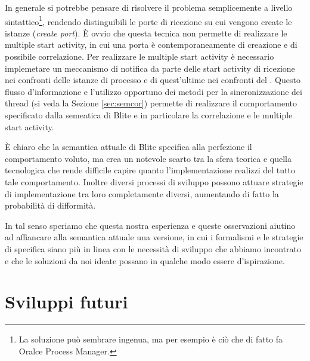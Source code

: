 In generale si potrebbe pensare di risolvere il problema semplicemente a livello
sintattico\footnote{La soluzione può sembrare ingenua, ma per esempio è ciò che
di fatto fa Oralce Process Manager.}, rendendo distinguibili le porte di
ricezione su cui vengono create le istanze (\emph{create port}). \`E ovvio che
questa tecnica non permette di realizzare le multiple start activity, in cui una
porta è contemporaneamente di creazione e di possibile correlazione. Per
realizzare le multiple start activity è necessario implemetare un meccanismo di
notifica da parte delle start activity di ricezione nei confronti delle istanze
di processo e di quest'ultime nei confronti del . Questo
flusso d'informazione e l'utilizzo opportuno dei metodi per la sincronizzazione
dei thread (si veda la Sezione \ref{sec:semcor}) permette di realizzare il comportamento
specificato dalla semeatica di Blite e in particolare la correlazione e le
multiple start activity.


\`E chiaro che la semantica attuale di Blite specifica alla perfezione il
comportamento voluto, ma crea un notevole scarto tra la sfera teorica e quella
tecnologica che rende difficile capire quanto l'implementazione realizzi del
tutto tale comportamento. Inoltre diversi processi di sviluppo possono attuare
strategie di implementazione tra loro completamente diversi, aumentando di fatto
la probabilità di difformità.

In tal senso speriamo che questa nostra esperienza e queste osservazioni
aiutino ad affiancare alla semantica attuale una versione, in cui i formalismi e
le strategie di specifica siano più in linea con le necessità di sviluppo che
abbiamo incontrato e che le soluzioni da noi ideate possano in qualche modo
essere d'ispirazione.
  
\section{Sviluppi futuri}

